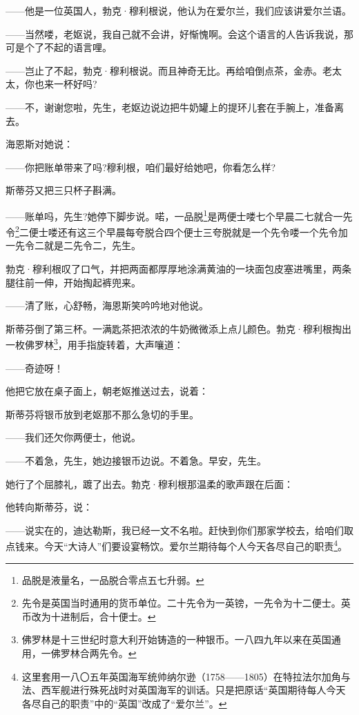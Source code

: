 \par ——他是一位英国人，勃克·穆利根说，他认为在爱尔兰，我们应该讲爱尔兰语。
\par ——当然喽，老妪说，我自己就不会讲，好惭愧啊。会这个语言的人告诉我说，那可是个了不起的语言哩。
\par ——岂止了不起，勃克·穆利根说。而且神奇无比。再给咱倒点茶，金赤。老太太，你也来一杯好吗?
\par ——不，谢谢您啦，先生，老妪边说边把牛奶罐上的提环儿套在手腕上，准备离去。
\par 海恩斯对她说：
\par ——你把账单带来了吗?穆利根，咱们最好给她吧，你看怎么样?
\par 斯蒂芬又把三只杯子斟满。
\par ——账单吗，先生?她停下脚步说。喏，一品脱\footnote{品脱是液量名，一品脱合零点五七升弱。}是两便士喽七个早晨二七就合一先令\footnote{先令是英国当时通用的货币单位。二十先令为一英镑，一先令为十二便士。英币改为十进制后，合十便士。}二便士喽还有这三个早晨每夸脱合四个便士三夸脱就是一个先令喽一个先令加一先令二就是二先令二，先生。
\par 勃克·穆利根叹了口气，并把两面都厚厚地涂满黄油的一块面包皮塞进嘴里，两条腿往前一伸，开始掏起裤兜来。
\par ——清了账，心舒畅，海恩斯笑吟吟地对他说。
\par 斯蒂芬倒了第三杯。一满匙茶把浓浓的牛奶微微添上点儿颜色。勃克·穆利根掏出一枚佛罗林\footnote{佛罗林是十三世纪时意大利开始铸造的一种银币。一八四九年以来在英国通用，一佛罗林合两先令。}，用手指旋转着，大声嚷道：
\par ——奇迹呀！
\par 他把它放在桌子面上，朝老妪推送过去，说着：
\par 斯蒂芬将银币放到老妪那不那么急切的手里。
\par ——我们还欠你两便士，他说。
\par ——不着急，先生，她边接银币边说。不着急。早安，先生。
\par 她行了个屈膝礼，踱了出去。勃克·穆利根那温柔的歌声跟在后面：
\par 他转向斯蒂芬，说：
\par ——说实在的，迪达勒斯，我已经一文不名啦。赶快到你们那家学校去，给咱们取点钱来。今天“大诗人”们要设宴畅饮。爱尔兰期待每个人今天各尽自己的职责\footnote{这里套用一八〇五年英国海军统帅纳尔逊（1758——1805）在特拉法尔加角与法、西军舰进行殊死战时对英国海军的训话。只是把原话“英国期待每人今天各尽自己的职责”中的“英国”改成了“爱尔兰”。}。
